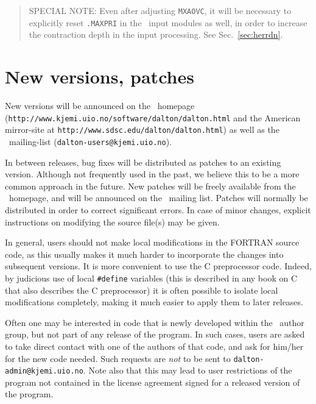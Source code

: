 \begin{quote}
SPECIAL NOTE: Even after adjusting \verb|MXAOVC|, it will be
necessary to explicitly reset \verb|.MAXPRI| in the
\her\ input modules as well, in order to increase the contraction depth
in the input processing.  See Sec.~\ref{sec:herrdn}.
\end{quote}

\section{New versions, patches}

New versions will be announced on the \dalton\
homepage\\
(\verb|http://www.kjemi.uio.no/software/dalton/dalton.html| 
and the American mirror-site at \verb|http://www.sdsc.edu/dalton/dalton.html|) 
as well
as the \dalton\ mailing-list
(\verb|dalton-users@kjemi.uio.no|).

In between releases, bug fixes will be distributed as
patches to an
existing version. Although not frequently used in the past, we believe
this to be a more common approach in the future. New patches will be
freely available from the 
\dalton\ homepage, and will be announced on the \dalton\ mailing
list. Patches will normally be distributed in order to correct
significant errors. In case of minor changes, explicit
instructions on modifying the source file(s) may be given.

In general, users should not make local
modifications in the FORTRAN source code, as this usually makes it
much harder to incorporate the changes into subsequent versions.
It is more convenient to use the C preprocessor code.  Indeed, by
judicious use of local \verb|#define|\index{define} variables (this
is described in any book on C that also describes the C
preprocessor) it is often possible to isolate local
modifications completely, making it much easier
to apply them to later
releases.

Often one may be interested in code that is newly developed\index{new
code} within the
\dalton\ author group, but not part of any release of the program. In
such cases, users are asked to take direct contact with one of the
authors of that code, and ask for him/her for the new code
needed. Such requests are {\em not} to be sent to
\verb|dalton-admin@kjemi.uio.no|. Note also that this may lead to user
restrictions of the program not contained in the license agreement
signed for a released version of the program.

